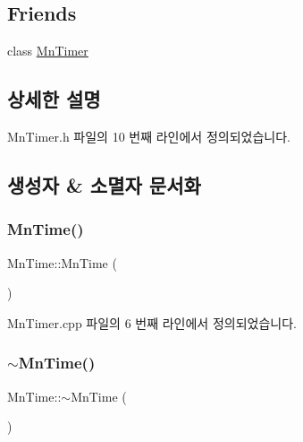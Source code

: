 \subsection*{Friends}
\begin{DoxyCompactItemize}
\item 
class \hyperlink{class_m_n_l_1_1_mn_time_a20cc0aebee1394de2a91e8c36a6e49b0}{Mn\+Timer}
\end{DoxyCompactItemize}


\subsection{상세한 설명}


Mn\+Timer.\+h 파일의 10 번째 라인에서 정의되었습니다.



\subsection{생성자 \& 소멸자 문서화}
\mbox{\label{class_m_n_l_1_1_mn_time_abe93779fd018a3655cc7f37065a8c373}} 
\subsubsection{\texorpdfstring{Mn\+Time()}{MnTime()}}
{\footnotesize\ttfamily Mn\+Time\+::\+Mn\+Time (\begin{DoxyParamCaption}{ }\end{DoxyParamCaption})}



Mn\+Timer.\+cpp 파일의 6 번째 라인에서 정의되었습니다.

\mbox{\label{class_m_n_l_1_1_mn_time_ac3a57cc8d4e6c4259458911b1059c45f}} 
\subsubsection{\texorpdfstring{$\sim$\+Mn\+Time()}{~MnTime()}}
{\footnotesize\ttfamily Mn\+Time\+::$\sim$\+Mn\+Time (\begin{DoxyParamCaption}{ }\end{DoxyParamCaption})}



